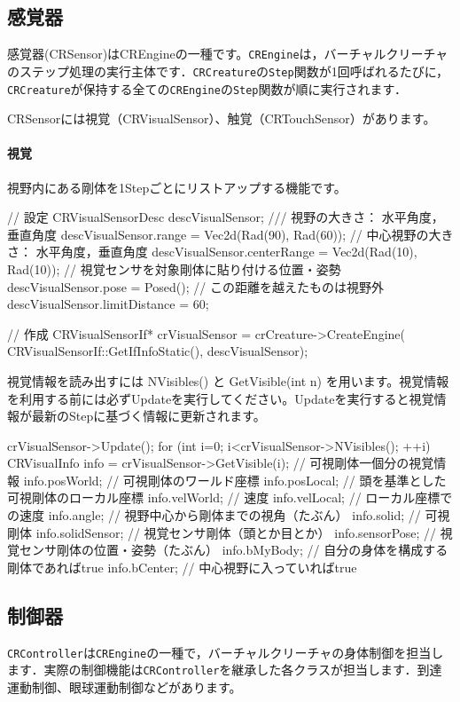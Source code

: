 \subsection{感覚器}

\KLUDGE 感覚器(CRSensor)はCREngineの一種です。\texttt{CREngine}は，バーチャルクリーチャのステップ処理の実行主体です．\texttt{CRCreature}の\texttt{Step}関数が1回呼ばれるたびに，\texttt{CRCreature}が保持する全ての\texttt{CREngine}の\texttt{Step}関数が順に実行されます．

CRSensorには視覚（CRVisualSensor）、触覚（CRTouchSensor）があります。

\paragraph{視覚}

\KLUDGE 視野内にある剛体を1Stepごとにリストアップする機能です。
\begin{sourcecode}
// 設定
CRVisualSensorDesc descVisualSensor;
/// 視野の大きさ： 水平角度，垂直角度
descVisualSensor.range = Vec2d(Rad(90), Rad(60));
// 中心視野の大きさ： 水平角度，垂直角度
descVisualSensor.centerRange = Vec2d(Rad(10), Rad(10));
// 視覚センサを対象剛体に貼り付ける位置・姿勢
descVisualSensor.pose = Posed();
// この距離を越えたものは視野外        
descVisualSensor.limitDistance = 60;	

// 作成
CRVisualSensorIf* crVisualSensor = crCreature->CreateEngine(
  CRVisualSensorIf::GetIfInfoStatic(), descVisualSensor);
\end{sourcecode}

\KLUDGE 視覚情報を読み出すには NVisibles() と GetVisible(int n) を用います。視覚情報を利用する前には必ずUpdateを実行してください。Updateを実行すると視覚情報が最新のStepに基づく情報に更新されます。
\begin{sourcecode}
crVisualSensor->Update();
for (int i=0; i<crVisualSensor->NVisibles(); ++i) {
	CRVisualInfo info = crVisualSensor->GetVisible(i);
	// 可視剛体一個分の視覚情報
	info.posWorld;    // 可視剛体のワールド座標
	info.posLocal;    // 頭を基準とした可視剛体のローカル座標
	info.velWorld;    // 速度
	info.velLocal;    // ローカル座標での速度
	info.angle;       // 視野中心から剛体までの視角（たぶん）
	info.solid;       // 可視剛体
	info.solidSensor; // 視覚センサ剛体（頭とか目とか）
	info.sensorPose;  // 視覚センサ剛体の位置・姿勢（たぶん）
	info.bMyBody;     // 自分の身体を構成する剛体であればtrue
	info.bCenter;     // 中心視野に入っていればtrue
}
\end{sourcecode}


\subsection{制御器}

\texttt{CRController}は\texttt{CREngine}の一種で，バーチャルクリーチャの身体制御を担当します．実際の制御機能は\texttt{CRController}を継承した各クラスが担当します．到達運動制御、眼球運動制御などがあります。

